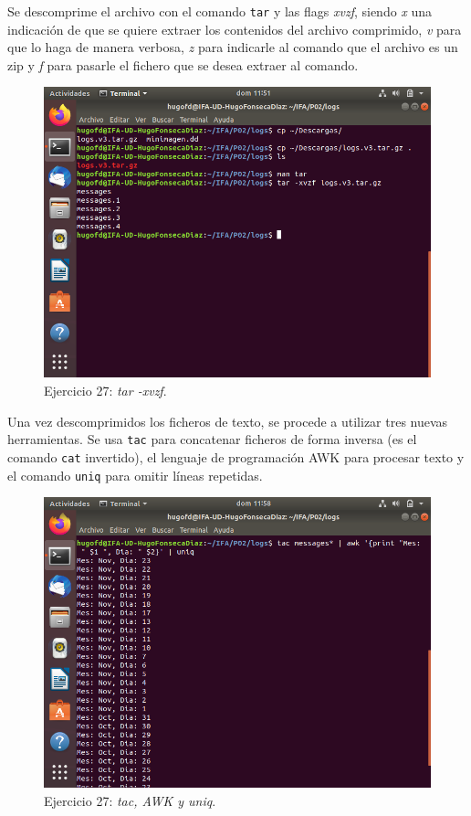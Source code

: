 \documentclass[11pt]{article}
\begin{document}
Se descomprime el archivo con el comando \verb|tar| y las flags \textit{xvzf}, siendo \textit{x} una indicación de que se quiere extraer los contenidos del archivo comprimido, \textit{v} para que lo haga de manera verbosa, \textit{z} para indicarle al comando que el archivo es un zip y \textit{f} para pasarle el fichero que se desea extraer al comando.

\begin{figure}[H]
    \caption{Ejercicio 27: \textit{tar -xvzf}.}
  \centering
  \includegraphics[scale=0.7, trim={0 7cm 0 0}, clip]{p02/e27-1.png}
\end{figure}

Una vez descomprimidos los ficheros de texto, se procede a utilizar tres nuevas herramientas. Se usa \verb|tac| para concatenar ficheros de forma inversa (es el comando \verb|cat| invertido), el lenguaje de programación AWK para procesar texto y el comando \verb|uniq| para omitir líneas repetidas.

\begin{figure}[H]
    \caption{Ejercicio 27: \textit{tac, AWK y uniq}.}
  \centering
  \includegraphics[scale=0.7]{p02/e27-2.png}
\end{figure}
\end{document}
